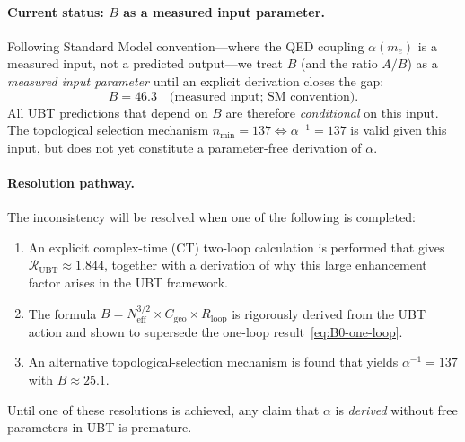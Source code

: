 \documentclass[11pt,a4paper]{article}
\theoremstyle{remark}
\begin{document}
\paragraph{Current status: $B$ as a measured input parameter.}
Following Standard Model convention---where the QED coupling $\alpha(m_e)$ is a measured input, not a predicted output---we treat $B$ (and the ratio $A/B$) as a \emph{measured input parameter} until an explicit derivation closes the gap:
\begin{equation}
B = 46.3 \quad \text{(measured input; SM convention)}.
\label{eq:B-SM-convention}
\end{equation}
All UBT predictions that depend on $B$ are therefore \emph{conditional} on this input. The topological selection mechanism $n_{\min} = 137 \Leftrightarrow \alpha^{-1} = 137$ is valid given this input, but does not yet constitute a parameter-free derivation of $\alpha$.

\paragraph{Resolution pathway.}
The inconsistency will be resolved when one of the following is completed:
\begin{enumerate}
  \item An explicit complex-time (CT) two-loop calculation is performed that gives $\mathcal{R}_{\mathrm{UBT}} \approx 1.844$, together with a derivation of why this large enhancement factor arises in the UBT framework.
  \item The formula $B = N_{\mathrm{eff}}^{3/2} \times C_{\mathrm{geo}} \times R_{\mathrm{loop}}$ is rigorously derived from the UBT action and shown to supersede the one-loop result~\eqref{eq:B0-one-loop}.
  \item An alternative topological-selection mechanism is found that yields $\alpha^{-1} = 137$ with $B \approx 25.1$.
\end{enumerate}
Until one of these resolutions is achieved, any claim that $\alpha$ is \emph{derived} without free parameters in UBT is premature.

\end{document}
